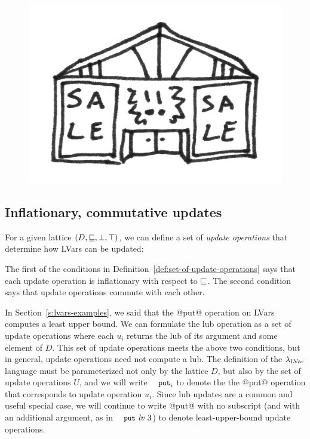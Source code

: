 \ifdefined\DISSERTATION
\begin{figure}
  \vspace{-2em}
  \begin{center}
    \includegraphics[scale=0.15]{../illustrations/store}
  \end{center}
  \vspace{-2em}
\end{figure}
\fi

\subsection{Inflationary, commutative updates}\label{subsection:lvars-inflationary-commutative}

For a given lattice $(D, \sqsubseteq, \bot, \top)$, we can define a set
of \emph{update operations} that determine how LVars can be updated:

\DefSetOfUpdateOperations
%
The first of the conditions in
Definition~\ref{def:set-of-update-operations} says that each update
operation is inflationary with respect to $\sqsubseteq$.  The second
condition says that update operations commute with each other.


In Section~\ref{s:lvars-examples}, we said that the @put@ operation on
LVars computes a least upper bound.  We can formulate the lub
operation as a set of update operations where each $u_i$ returns the
lub of its argument and some element of $D$.  This set of update
operations meets the above two conditions, but in general, update
operations need not compute a lub.  The definition of the
$\lambda_{\textrm{LVar}}$ language must be parameterized not only by the lattice
$D$, but also by the set of update operations $U$, and we will write
$\PUTi$ to denote the the @put@ operation that corresponds to update
operation $u_i$.  Since lub updates are a common and useful special
case, we will continue to write @put@ with no subscript (and with an
additional argument, as in $\putexp{\mathit{lv}}{3}$) to denote
least-upper-bound update operations.

